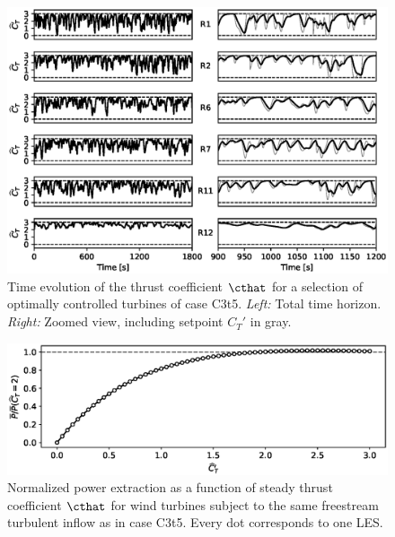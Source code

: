 	\begin{figure}
		\includegraphics[width=\textwidth]{chapters/analysis_induction_control/controls.eps}
		\caption[Time evolution of the thrust coefficient $\cthat$ for a selection of optimally controlled turbines  of case C3t5.]{Time evolution of the thrust coefficient $\cthat$ for a selection of optimally controlled turbines  of case C3t5. \emph{Left: } Total time horizon. \emph{Right: } Zoomed view, including setpoint $C_T'$ in gray. \label{fig:controls}}
	\end{figure}
	
	\begin{figure}
		\includegraphics[width=\textwidth]{chapters/analysis_induction_control/sweep_ct.eps}
		\caption[Normalized power extraction as a function of steady thrust coefficient $\cthat$ for wind turbines subject to the same freestream turbulent inflow as in case C3t5.]{Normalized power extraction as a function of steady thrust coefficient $\cthat$ for wind turbines subject to the same freestream turbulent inflow as in case C3t5. Every dot corresponds to one LES.\label{fig:ct_sweep}}
	\end{figure}
	
